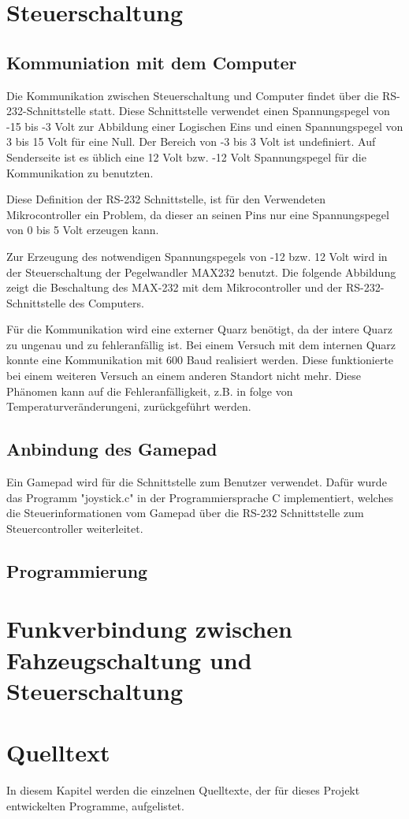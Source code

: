 \documentclass{scrartcl}
\begin{document}
\newpage

\section{Steuerschaltung}

	\subsection{Kommuniation mit dem Computer} %
		Die Kommunikation zwischen Steuerschaltung und Computer findet über die RS-232-Schnittstelle statt.
		Diese Schnittstelle verwendet einen Spannungspegel von -15 bis -3 Volt zur Abbildung einer Logischen Eins 
		und einen Spannungspegel von 3 bis 15 Volt für eine Null.
		Der Bereich von -3 bis 3 Volt ist undefiniert.
		Auf Senderseite ist es üblich eine 12 Volt bzw. -12 Volt Spannungspegel für die Kommunikation zu benutzten.

		Diese Definition der RS-232 Schnittstelle, ist für den Verwendeten Mikrocontroller ein Problem,
		da dieser an seinen Pins nur eine Spannungspegel von 0 bis 5 Volt erzeugen kann.

		Zur Erzeugung des notwendigen Spannungspegels von -12 bzw. 12 Volt wird in der Steuerschaltung der Pegelwandler MAX232 benutzt.
		Die folgende Abbildung zeigt die Beschaltung des MAX-232 mit dem Mikrocontroller und der RS-232-Schnittstelle des Computers.

		Für die Kommunikation wird eine externer Quarz benötigt, da der intere Quarz zu ungenau und zu fehleranfällig ist.
		Bei einem Versuch mit dem internen Quarz konnte eine Kommunikation mit 600 Baud realisiert werden.
		Diese funktionierte bei einem weiteren Versuch an einem anderen Standort nicht mehr.
		Diese Phänomen kann auf die Fehleranfälligkeit, z.B. in folge von Temperaturveränderungeni, zurückgeführt werden.

	\subsection{Anbindung des Gamepad} %
		Ein Gamepad wird für die Schnittstelle zum Benutzer verwendet.
		Dafür wurde das Programm "joystick.c" in der Programmiersprache C implementiert,
		welches die Steuerinformationen vom Gamepad über die RS-232 Schnittstelle zum Steuercontroller weiterleitet.
	
	\subsection{Programmierung} %

\section{Funkverbindung zwischen Fahzeugschaltung und Steuerschaltung} %

\newpage

\section{Quelltext} %
	In diesem Kapitel werden die einzelnen Quelltexte, der für dieses Projekt entwickelten Programme, aufgelistet.



\end{document}

